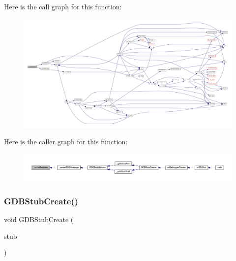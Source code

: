 Here is the call graph for this function\+:
\nopagebreak
\begin{figure}[H]
\begin{center}
\leavevmode
\includegraphics[width=350pt]{gdb-stub_8c_aa8d43b0007b4cac1d3dcad6212b8406e_cgraph}
\end{center}
\end{figure}
Here is the caller graph for this function\+:
\nopagebreak
\begin{figure}[H]
\begin{center}
\leavevmode
\includegraphics[width=350pt]{gdb-stub_8c_aa8d43b0007b4cac1d3dcad6212b8406e_icgraph}
\end{center}
\end{figure}
\mbox{\label{gdb-stub_8c_a22597ba75b0b4cfd482b774f19d0200a}} 
\subsubsection{\texorpdfstring{G\+D\+B\+Stub\+Create()}{GDBStubCreate()}}
{\footnotesize\ttfamily void G\+D\+B\+Stub\+Create (\begin{DoxyParamCaption}\item[{struct G\+D\+B\+Stub $\ast$}]{stub }\end{DoxyParamCaption})}

